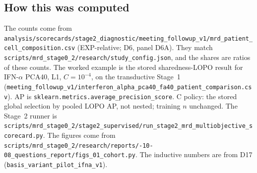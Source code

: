 \subsection*{How this was computed}
{\small\raggedright The counts come from \texttt{analysis/\allowbreak scorecards/\allowbreak stage2\_diagnostic/\allowbreak meeting\_followup\_v1/\allowbreak mrd\_patient\_cell\_composition.csv} (EXP-relative; D6, panel D6A). They match \texttt{scripts/\allowbreak mrd\_stage0\_2/\allowbreak research/\allowbreak study\_config.json}, and the shares are ratios of these counts. The worked example is the stored sharedness-LOPO result for IFN-$\alpha$ PCA40, L1, $C=10^{-4}$, on the transductive Stage~1 (\texttt{meeting\_followup\_v1/\allowbreak interferon\_alpha\_pca40\_fa40\_\allowbreak patient\_comparison.csv}). AP is \texttt{sklearn.metrics.\allowbreak average\_precision\_score}. C policy: the stored global selection by pooled LOPO AP, not nested; training $n$ unchanged. The Stage~2 runner is \texttt{scripts/\allowbreak mrd\_stage0\_2/\allowbreak stage2\_supervised/\allowbreak run\_stage2\_mrd\_multiobjective\_\allowbreak scorecard.py}. The figures come from \texttt{scripts/\allowbreak mrd\_stage0\_2/\allowbreak research/\allowbreak reports/-10-08\_questions\_report/\allowbreak figs\_01\_cohort.py}. The inductive numbers are from D17 (\texttt{basis\_variant\_pilot\_ifna\_v1}). \par}

